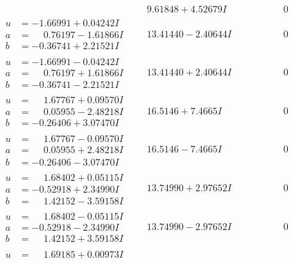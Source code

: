 \documentclass[1p]{elsarticle_modified}
\theoremstyle{definition}
\begin{document}
$$\begin{array}{c|c|c}
 & \phantom{-}9.61848 + 4.52679 I & \phantom{-0.000000 } 0 \\ \hline\begin{aligned}
u &= -1.66991 + 0.04242 I \\
a &= \phantom{-}0.76197 - 1.61866 I \\
b &= -0.36741 + 2.21521 I\end{aligned}
 & \phantom{-}13.41440 - 2.40644 I & \phantom{-0.000000 } 0 \\ \hline\begin{aligned}
u &= -1.66991 - 0.04242 I \\
a &= \phantom{-}0.76197 + 1.61866 I \\
b &= -0.36741 - 2.21521 I\end{aligned}
 & \phantom{-}13.41440 + 2.40644 I & \phantom{-0.000000 } 0 \\ \hline\begin{aligned}
u &= \phantom{-}1.67767 + 0.09570 I \\
a &= \phantom{-}0.05955 - 2.48218 I \\
b &= -0.26406 + 3.07470 I\end{aligned}
 & \phantom{-}16.5146 + 7.4665 I & \phantom{-0.000000 } 0 \\ \hline\begin{aligned}
u &= \phantom{-}1.67767 - 0.09570 I \\
a &= \phantom{-}0.05955 + 2.48218 I \\
b &= -0.26406 - 3.07470 I\end{aligned}
 & \phantom{-}16.5146 - 7.4665 I & \phantom{-0.000000 } 0 \\ \hline\begin{aligned}
u &= \phantom{-}1.68402 + 0.05115 I \\
a &= -0.52918 + 2.34990 I \\
b &= \phantom{-}1.42152 - 3.59158 I\end{aligned}
 & \phantom{-}13.74990 + 2.97652 I & \phantom{-0.000000 } 0 \\ \hline\begin{aligned}
u &= \phantom{-}1.68402 - 0.05115 I \\
a &= -0.52918 - 2.34990 I \\
b &= \phantom{-}1.42152 + 3.59158 I\end{aligned}
 & \phantom{-}13.74990 - 2.97652 I & \phantom{-0.000000 } 0 \\ \hline\begin{aligned}
u &= \phantom{-}1.69185 + 0.00973 I \\

\end{aligned}
\end{array}$$
\end{document}
